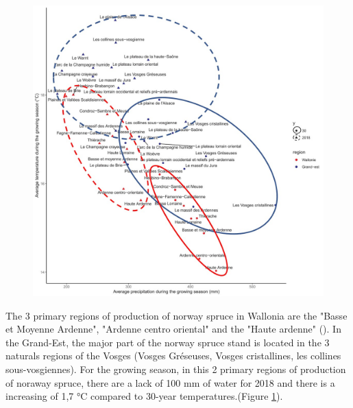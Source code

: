 \documentclass[3p,times]{elsarticle}
\begin{document}
\begin{figure}
	\centering
	\includegraphics[width=\textwidth]{clim_region_nat_GE_Wal_en.jpg}
	\caption{	}
	
	\label{fig:clim}
\end{figure}
The 3 primary regions of production of norway spruce in Wallonia are the "Basse et Moyenne Ardenne", "Ardenne centro oriental" and the "Haute ardenne" (\citep{van_der_perre_carte_2015}). In the Grand-Est, the major part of the norway spruce stand is located in the 3 naturals regions of the Vosges (Vosges Gréseuses, Vosges cristallines, les collines sous-vosgiennes). For the growing season, in this 2 primary regions of production of noraway spruce, there are a lack of 100 mm of water for 2018 and there is a increasing of 1,7 °C compared to 30-year temperatures.(Figure \ref{fig:clim}). 




	
\end{document}
